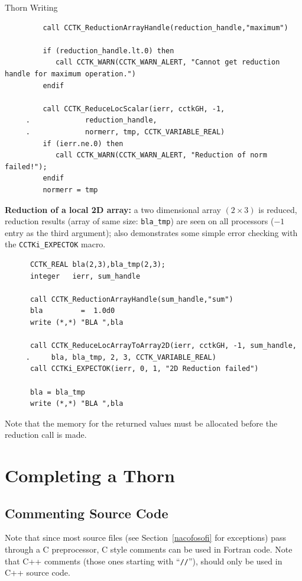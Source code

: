 \begin{cactuspart}{Thorn Writing}
\begin{verbatim}
         call CCTK_ReductionArrayHandle(reduction_handle,"maximum")

         if (reduction_handle.lt.0) then
            call CCTK_WARN(CCTK_WARN_ALERT, "Cannot get reduction handle for maximum operation.")
         endif

         call CCTK_ReduceLocScalar(ierr, cctkGH, -1, 
     .             reduction_handle,
     .             normerr, tmp, CCTK_VARIABLE_REAL)
         if (ierr.ne.0) then
            call CCTK_WARN(CCTK_WARN_ALERT, "Reduction of norm failed!");
         endif
         normerr = tmp
\end{verbatim}


{\bf Reduction of a local 2D array:} a two dimensional array $(2\times3)$ is 
reduced, reduction results (array of same size: \texttt{bla\_tmp}) are seen
on all processors ($-1$ entry as the third argument); also demonstrates
some simple error checking with the \texttt{CCTKi\_EXPECTOK} macro.
\begin{verbatim}
      CCTK_REAL bla(2,3),bla_tmp(2,3);
      integer   ierr, sum_handle

      call CCTK_ReductionArrayHandle(sum_handle,"sum")
      bla         =  1.0d0
      write (*,*) "BLA ",bla

      call CCTK_ReduceLocArrayToArray2D(ierr, cctkGH, -1, sum_handle,
     .     bla, bla_tmp, 2, 3, CCTK_VARIABLE_REAL)
      call CCTKi_EXPECTOK(ierr, 0, 1, "2D Reduction failed")

      bla = bla_tmp
      write (*,*) "BLA ",bla
\end{verbatim}

Note that the memory for the returned values must be allocated before
the reduction call is made.



\section{Completing a Thorn}


\subsection{Commenting Source Code}

Note that since most source files (see Section~\ref{nacofosofi} for
exceptions) pass through a C preprocessor, C style comments can be
used in Fortran code. Note that C++ comments (those ones starting
with ``\texttt{//}''),
should only be used in C++ source code.


\end{cactuspart}
